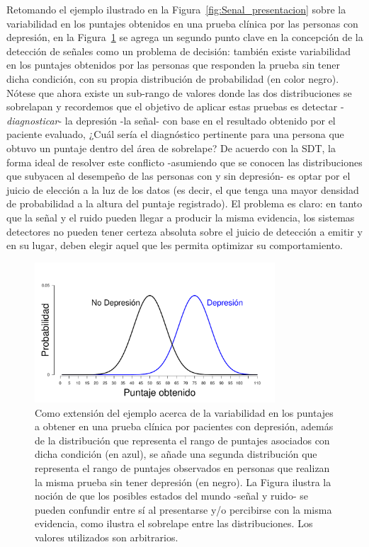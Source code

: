 Retomando el ejemplo ilustrado en la Figura~\ref{fig:Senal_presentacion} sobre la variabilidad en los puntajes obtenidos en una prueba clínica por las personas con depresión, en la Figura~\ref{fig:Noise} se agrega un segundo punto clave en la concepción de la detección de señales como un problema de decisión: también existe variabilidad en los puntajes obtenidos por las personas que responden la prueba sin tener dicha condición, con su propia distribución de probabilidad (en color negro). Nótese que ahora existe un sub-rango de valores donde las dos distribuciones se sobrelapan y recordemos que el objetivo de aplicar estas pruebas es detectar -\textit{diagnosticar}- la depresión -la señal- con base en el resultado obtenido por el paciente evaluado, ¿Cuál sería el diagnóstico pertinente para una persona que obtuvo un puntaje dentro del área de sobrelape? De acuerdo con la SDT, la forma ideal de resolver este conflicto -asumiendo que se conocen las distribuciones que subyacen al desempeño de las personas con y sin depresión- es optar por el juicio de elección  a la luz de los datos (es decir, el que tenga una mayor densidad de probabilidad a la altura del puntaje registrado). El problema es claro: en tanto que la señal y el ruido pueden llegar a producir la misma evidencia, los sistemas detectores no pueden tener certeza absoluta sobre el juicio de detección a emitir y en su lugar, deben elegir aquel que les permita optimizar su comportamiento.\\ 

\begin{figure}[th]
\centering
\includegraphics[width=0.80\textwidth]{Figures/Noise} 
\caption[Variabilidad en la señal y en el ruido]{Como extensión del ejemplo acerca de la variabilidad en los puntajes a obtener en una prueba clínica por pacientes con depresión, además de la distribución que representa el rango de puntajes asociados con dicha condición (en azul), se añade una segunda distribución que representa el rango de puntajes observados en personas que realizan la misma prueba sin tener depresión (en negro). La Figura ilustra la noción de que los posibles estados del mundo -señal y ruido- se pueden confundir entre sí al presentarse y/o percibirse con la misma evidencia, como ilustra el sobrelape entre las distribuciones. Los valores utilizados son arbitrarios.}
\label{fig:Noise}
\end{figure}

